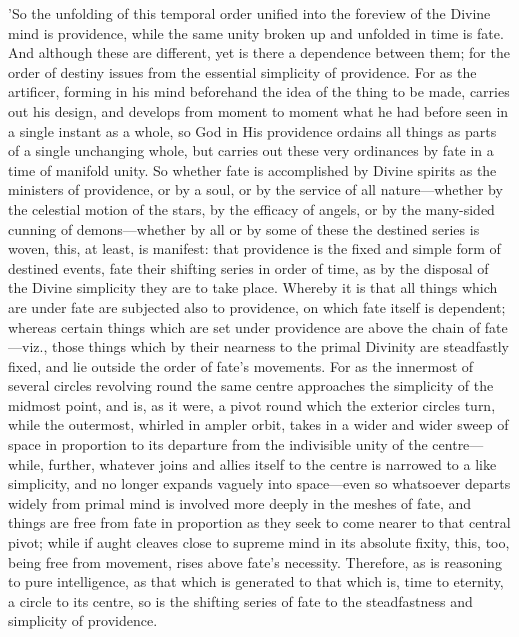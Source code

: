 'So the unfolding of this temporal order unified into the foreview of
the Divine mind is providence, while the same unity broken up and
unfolded in time is fate. And although these are different, yet is there
a dependence between them; for the order of destiny issues from the
essential simplicity of providence. For as the artificer, forming in his
mind beforehand the idea of the thing to be made, carries out his
design, and develops from moment to moment what he had before seen in a
single instant as a whole, so God in His providence ordains all things
as parts of a single unchanging whole, but carries out these very
ordinances by fate in a time of manifold unity. So whether fate is
accomplished by Divine spirits as the ministers of providence, or by a
soul, or by the service of all nature—whether by the celestial motion
of the stars, by the efficacy of angels, or by the many-sided cunning of
demons—whether by all or by some of these the destined series is woven,
this, at least, is manifest: that providence is the fixed and simple
form of destined events, fate their shifting series in order of time, as
by the disposal of the Divine simplicity they are to take place. Whereby
it is that all things which are under fate are subjected also to
providence, on which fate itself is dependent; whereas certain things
which are set under providence are above the chain of fate—viz., those
things which by their nearness to the primal Divinity are steadfastly
fixed, and lie outside the order of fate's movements. For as the
innermost of several circles revolving round the same centre approaches
the simplicity of the midmost point, and is, as it were, a pivot round
which the exterior circles turn, while the outermost, whirled in ampler
orbit, takes in a wider and wider sweep of space in proportion to its
departure from the indivisible unity of the centre—while, further,
whatever joins and allies itself to the centre is narrowed to a like
simplicity, and no longer expands vaguely into space—even so whatsoever
departs widely from primal mind is involved more deeply in the meshes of
fate, and things are free from fate in proportion as they seek to come
nearer to that central pivot; while if aught cleaves close to supreme
mind in its absolute fixity, this, too, being free from movement, rises
above fate's necessity. Therefore, as is reasoning to pure intelligence,
as that which is generated to that which is, time to eternity, a circle
to its centre, so is the shifting series of fate to the steadfastness
and simplicity of providence.

